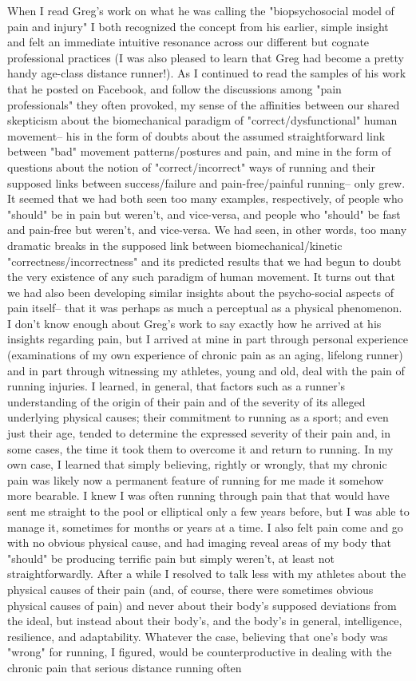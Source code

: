 When I read Greg's work on what he was calling the "biopsychosocial model of pain and injury" I both recognized the concept from his earlier, simple insight and felt an immediate intuitive resonance across our different but cognate professional practices (I was also pleased to learn that Greg had become a pretty handy age-class distance runner!). As I continued to read the samples of his work that he posted on Facebook, and follow the discussions among "pain professionals" they often provoked, my sense of the affinities between our shared skepticism about the biomechanical paradigm of "correct/dysfunctional" human movement-- his in the form of doubts about the assumed straightforward link between "bad" movement patterns/postures and pain, and mine in the form of questions about the notion of "correct/incorrect" ways of running and their supposed links between success/failure and pain-free/painful running-- only grew. It seemed that we had both seen too many examples, respectively, of people who "should" be in pain but weren't, and vice-versa, and people who "should" be fast and pain-free but weren't, and vice-versa. We had seen, in other words, too many dramatic breaks in the supposed link between biomechanical/kinetic "correctness/incorrectness" and its predicted results that we had begun to doubt the very existence of any such paradigm of human movement. It turns out that we had also been developing similar insights about the psycho-social aspects of pain itself-- that it was perhaps as much a perceptual as a physical phenomenon. I don't know enough about Greg's work to say exactly how he arrived at his insights regarding pain, but I arrived at mine in part through personal experience (examinations of my own experience of chronic pain as an aging, lifelong runner) and in part through witnessing my athletes, young and old, deal with the pain of running injuries. I learned, in general, that factors such as a runner's understanding of the origin of their pain and of the severity of its alleged underlying physical causes; their commitment to running as a sport; and even just their age, tended to determine the expressed severity of their pain and, in some cases, the time it took them to overcome it and return to running. In my own case, I learned that simply believing, rightly or wrongly, that my chronic pain was likely now a permanent feature of running for me made it somehow more bearable. I knew I was often running through pain that that would have sent me straight to the pool or elliptical only a few years before, but I was able to manage it, sometimes for months or years at a time. I also felt pain come and go with no obvious physical cause, and had imaging reveal areas of my body that "should" be producing terrific pain but simply weren't, at least not straightforwardly. After a while I resolved to talk less with my athletes about the physical causes of their pain (and, of course, there were sometimes obvious physical causes of pain) and never about their body's supposed deviations from the ideal, but instead about their body's, and the body's in general, intelligence, resilience, and adaptability. Whatever the case, believing that one's body was "wrong" for running, I figured, would be counterproductive in dealing with the chronic pain that serious distance running often 